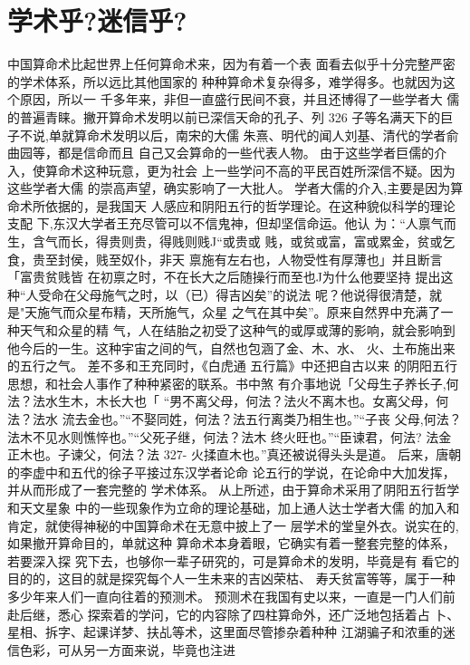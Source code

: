 \section{学术乎?迷信乎?}

中国算命术比起世界上任何算命术来，因为有着一个表
面看去似乎十分完整严密的学术体系，所以远比其他国家的
种种算命术复杂得多，难学得多。也就因为这个原因，所以一
千多年来，非但一直盛行民间不衰，并且还博得了一些学者大
儒的普遍青睐。撇开算命术发明以前已深信天命的孔子、列
 326 
子等名满天下的巨子不说,单就算命术发明以后，南宋的大儒
朱熹、明代的闻人刘基、清代的学者俞曲园等，都是信命而且
自己又会算命的一些代表人物。
由于这些学者巨儒的介入，使算命术这种玩意，更为社会
上一些学问不高的平民百姓所深信不疑。因为这些学者大儒
的崇高声望，确实影响了一大批人。
学者大儒的介入,主要是因为算命术所依据的，是我国天
人感应和阴阳五行的哲学理论。在这种貌似科学的理论支配
下,东汉大学者王充尽管可以不信鬼神，但却坚信命运。他认
为：“人禀气而生，含气而长，得贵则贵，得贱则贱J“或贵或
贱，或贫或富，富或累金，贫或乞食，贵至封侯，贱至奴仆，非天
禀施有左右也，人物受性有厚薄也」并且断言「富贵贫贱皆
在初禀之时，不在长大之后随操行而至也J为什么他要坚持
提出这种“人受命在父母施气之时，以（已）得吉凶矣”的说法
呢？他说得很清楚，就是"天施气而众星布精，天所施气，众星
之气在其中矣”。原来自然界中充满了一种天气和众星的精
气，人在结胎之初受了这种气的或厚或薄的影响，就会影响到
他今后的一生。这种宇宙之间的气，自然也包涵了金、木、水、
火、土布施出来的五行之气。
差不多和王充同时，《白虎通  五行篇》中还把自古以来
的阴阳五行思想，和社会人事作了种种紧密的联系。书中煞
有介事地说「父母生子养长子,何法？法水生木，木长大也「
“男不离父母，何法？法火不离木也。女离父母，何法？法水
流去金也。”“不娶同姓，何法？法五行离类乃相生也。”“子丧
父母,何法？法木不见水则憔悴也。”“父死子继，何法？法木
终火旺也。”“臣谏君，何法? 法金正木也。子谏父，何法？法
327-
火揉直木也。”真还被说得头头是道。
后来，唐朝的李虚中和五代的徐子平接过东汉学者论命
论五行的学说，在论命中大加发挥，并从而形成了一套完整的
学术体系。
从上所述，由于算命术采用了阴阳五行哲学和天文星象
中的一些现象作为立命的理论基础，加上通人达士学者大儒
的加入和肯定，就使得神秘的中国算命术在无意中披上了一
层学术的堂皇外衣。说实在的,如果撤开算命目的，单就这种
算命术本身着眼，它确实有着一整套完整的体系，若要深入探
究下去，也够你一辈子研究的，可是算命术的发明，毕竟是有
看它的目的的，这目的就是探究每个人一生未来的吉凶荣枯、
寿夭贫富等等，属于一种多少年来人们一直向往着的预测术。
预测术在我国有史以来，一直是一门人们前赴后继，悉心
探索着的学问，它的内容除了四柱算命外，还广泛地包括着占
卜、星相、拆字、起课详梦、扶乩等术，这里面尽管掺杂着种种
江湖骗子和浓重的迷信色彩，可从另一方面来说，毕竟也注进
